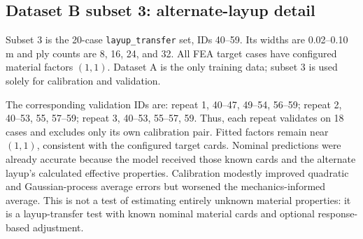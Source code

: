 \documentclass[11pt]{article}
\begin{document}
\subsection{Dataset B subset 3: alternate-layup detail}
Subset 3 is the 20-case \texttt{layup\_transfer} set, IDs 40--59. Its widths are 0.02--0.10 m and ply counts are 8, 16, 24, and 32. All FEA target cases have configured material factors $(1,1)$. Dataset A is the only training data; subset 3 is used solely for calibration and validation.

\begin{table}[ht]
\centering
\small
\caption{Subset 3 calibration pairs, fitted scale factors, and held-out MAPE.}
\end{table}

The corresponding validation IDs are: repeat 1, 40--47, 49--54, 56--59; repeat 2, 40--53, 55, 57--59; repeat 3, 40--53, 55--57, 59. Thus, each repeat validates on 18 cases and excludes only its own calibration pair. Fitted factors remain near $(1,1)$, consistent with the configured target cards. Nominal predictions were already accurate because the model received those known cards and the alternate layup's calculated effective properties. Calibration modestly improved quadratic and Gaussian-process average errors but worsened the mechanics-informed average. This is not a test of estimating entirely unknown material properties: it is a layup-transfer test with known nominal material cards and optional response-based adjustment.
\end{document}
